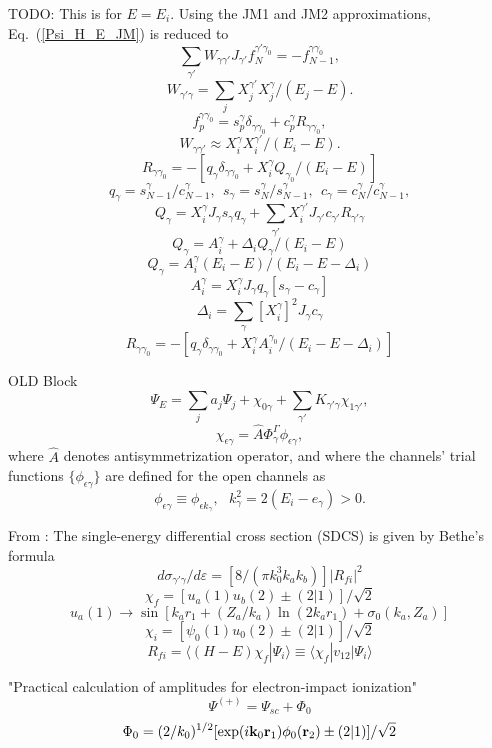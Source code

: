 \documentclass[aip
, pra
, showpacs
, aps
, twocolumn
, groupedaddress
, floatfix
]{revtex4}
\newcommand{\beq}{\begin{equation}}
\newcommand{\eeq}{\end{equation}}
\begin{document}
\newpage
TODO: This is for $E=E_i$.
Using the JM1 and JM2 approximations, Eq.~(\ref{Psi_H_E_JM}) is reduced to
\beq
\sum_{\gamma'} W_{\gamma \gamma'} J_{\gamma'} f^{\gamma' \gamma_0}_N
= - f_{N-1}^{\gamma \gamma_0} ,
\eeq
\beq
W_{\gamma' \gamma}= \sum_j  X_j^{\gamma'} X_j^{\gamma} / (E_j-E).
\eeq
\beq
f^{\gamma \gamma_0}_{p} =  s_{p}^{\gamma} \delta_{\gamma \gamma_0}
+ c_{p}^{\gamma} R_{\gamma \gamma_0},
\eeq
\beq
W_{\gamma \gamma'} \approx  X_i^{\gamma} X_i^{\gamma'} / (E_i-E).
\eeq
\beq
R_{\gamma \gamma_0} =  -
[ q_{\gamma} \delta_{\gamma \gamma_0} + X_i^{\gamma} Q_{\gamma_0} / (E_i-E)]
\eeq
\beq
q_{\gamma} = s_{N-1}^{\gamma} / c_{N-1}^{\gamma}, \ \
s_{\gamma} = s_N^{\gamma} / s_{N-1}^{\gamma}, \ \
c_{\gamma} = c_N^{\gamma} / c_{N-1}^{\gamma},
\eeq
\beq
Q_{\gamma} =  X_i^{\gamma} J_{\gamma} s_{\gamma} q_\gamma +
\sum_{\gamma'} X_i^{\gamma'} J_{\gamma'} c_{\gamma'} R_{\gamma' \gamma}
\eeq
\beq
Q_{\gamma} = A_i^\gamma  + \Delta_i Q_\gamma / (E_i-E)
\eeq
\beq
Q_{\gamma} = A_i^\gamma  (E_i-E)/ (E_i-E - \Delta_i)
\eeq
\beq
A_i^\gamma =
X_i^{\gamma} J_{\gamma} q_\gamma [s_{\gamma} -c_{\gamma} ]
\eeq
\beq
\Delta_i = \sum_{\gamma} [X_i^{\gamma}]^2 J_{\gamma} c_{\gamma}
\eeq
\beq
R_{\gamma \gamma_0} =  -
[ q_{\gamma} \delta_{\gamma \gamma_0} + X_i^{\gamma} A_i^{\gamma_0} / (E_i-E - \Delta_i)]
\eeq



OLD Block
\beq
 \Psi_{E}  =  \sum_j a_j \Psi_j + \chi_{0 \gamma}
+ \sum_{\gamma'}   K_{\gamma' \gamma}
\chi_{1 \gamma'} ,
\eeq
\beq
\chi_{\epsilon \gamma} = \hat{A} \Phi^\Gamma_{\gamma}  \phi_{\epsilon \gamma},
\eeq
where $\hat{A}$ denotes antisymmetrization operator,
and where the channels' trial functions $\{ \phi_{\epsilon \gamma} \}$ are defined for the open channels as
\beq
\phi_{\epsilon \gamma}\equiv \phi_{\epsilon k_\gamma}, \ \ \   k_{\gamma}^2 = 2(E_i - e_\gamma) > 0.
\eeq


From \cite{HZ11}:
The single-energy differential cross section (SDCS) is given by Bethe's formula
\beq
d\sigma_{\gamma' \gamma} / d \varepsilon = [8/(\pi k_0^3 k_a k_b)] |R_{fi}|^2
\eeq
\beq
\chi_f = [u_a(1) u_b(2) \pm (2|1)] /\sqrt{2}
\eeq
\beq
u_a(1) \rightarrow \sin[k_a r_1 + (Z_a/k_a) \ln(2k_a r_1) + \sigma_0(k_a, Z_a)]
\eeq
\beq
\chi_i = [\psi_0(1) u_0(2) \pm (2|1)] /\sqrt{2}
\eeq
\beq
R_{fi} = \langle (H-E) \chi_f | \Psi_i \rangle \equiv \langle \chi_f | v_{12}|\Psi_i \rangle
\eeq


"Practical calculation of amplitudes for electron-impact ionization" \cite{MHR01}
\beq
\Psi^{(+)} = \Psi_{sc}+ \Phi_0
\eeq
\beq
\Phi_0 = (2/k_0)^{1/2}[\exp(i{\bf k}_0 {\bf r}_1) \phi_0({\bf r}_2) \pm (2|1)] / \sqrt{2}
\eeq
\end{document}
